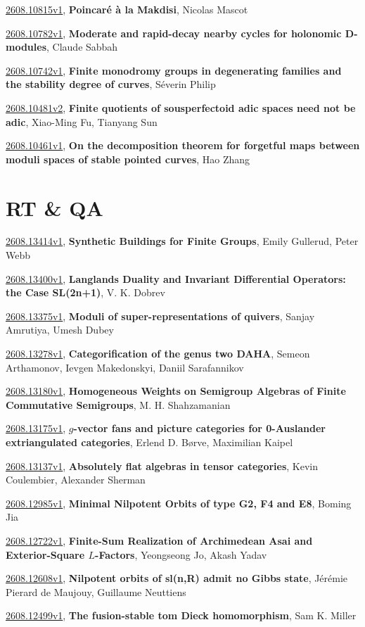 \documentclass[9pt, a4paper]{article}
\theoremstyle{plain}
\theoremstyle{definition}
\theoremstyle{remark}
\newcommand{\arxiv}[3]{\href{https://arxiv.org/abs/#1}{#1}, \textbf{\textcolor{arxivblue}{#2}}, #3}
\begin{document}
\arxiv{2608.10815v1}{Poincaré à la Makdisi}{Nicolas Mascot}

\arxiv{2608.10782v1}{Moderate and rapid-decay nearby cycles for holonomic D-modules}{Claude Sabbah}

\arxiv{2608.10742v1}{Finite monodromy groups in degenerating families and the stability degree of curves}{Séverin Philip}

\arxiv{2608.10481v2}{Finite quotients of sousperfectoid adic spaces need not be adic}{Xiao-Ming Fu, Tianyang Sun}

\arxiv{2608.10461v1}{On the decomposition theorem for forgetful maps between moduli spaces of stable pointed curves}{Hao Zhang}


\section{RT \& QA}
\arxiv{2608.13414v1}{Synthetic Buildings for Finite Groups}{Emily Gullerud, Peter Webb}

\arxiv{2608.13400v1}{Langlands Duality and Invariant Differential Operators: the Case SL(2n+1)}{V. K. Dobrev}

\arxiv{2608.13375v1}{Moduli of super-representations of quivers}{Sanjay Amrutiya, Umesh Dubey}

\arxiv{2608.13278v1}{Categorification of the genus two DAHA}{Semeon Arthamonov, Ievgen Makedonskyi, Daniil Sarafannikov}

\arxiv{2608.13180v1}{Homogeneous Weights on Semigroup Algebras of Finite Commutative Semigroups}{M. H. Shahzamanian}

\arxiv{2608.13175v1}{$g$-vector fans and picture categories for 0-Auslander extriangulated categories}{Erlend D. Børve, Maximilian Kaipel}

\arxiv{2608.13137v1}{Absolutely flat algebras in tensor categories}{Kevin Coulembier, Alexander Sherman}

\arxiv{2608.12985v1}{Minimal Nilpotent Orbits of type G2, F4 and E8}{Boming Jia}

\arxiv{2608.12722v1}{Finite-Sum Realization of Archimedean Asai and Exterior-Square $L$-Factors}{Yeongseong Jo, Akash Yadav}

\arxiv{2608.12608v1}{Nilpotent orbits of sl(n,R) admit no Gibbs state}{Jérémie Pierard de Maujouy, Guillaume Neuttiens}

\arxiv{2608.12499v1}{The fusion-stable tom Dieck homomorphism}{Sam K. Miller}
\end{document}
